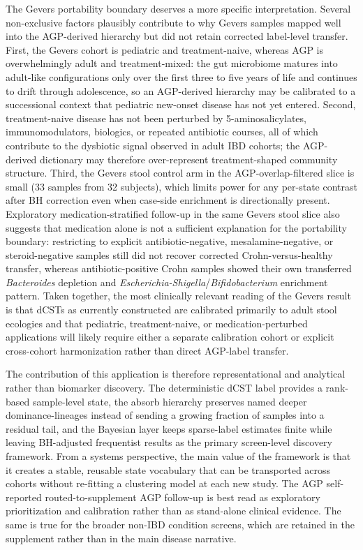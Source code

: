 \documentclass[
  11pt,
]{article}
\newcommand{\taxon}[1]{\emph{#1}}
\newcommand{\dcstsep}{/\allowbreak}
\begin{document}
The Gevers portability boundary deserves a more specific
interpretation. Several non-exclusive factors plausibly contribute to
why Gevers samples mapped well into the AGP-derived hierarchy but did
not retain corrected label-level transfer. First, the Gevers cohort is
pediatric and treatment-naive, whereas AGP is overwhelmingly adult and
treatment-mixed: the gut microbiome matures into adult-like
configurations only over the first three to five years of life and
continues to drift through adolescence, so an AGP-derived hierarchy may
be calibrated to a successional context that pediatric new-onset
disease has not yet entered. Second, treatment-naive disease has not
been perturbed by 5-aminosalicylates, immunomodulators, biologics, or
repeated antibiotic courses, all of which contribute to the dysbiotic
signal observed in adult IBD cohorts; the AGP-derived dictionary may
therefore over-represent treatment-shaped community structure. Third,
the Gevers stool control arm in the AGP-overlap-filtered slice is small
(33 samples from 32 subjects), which limits power for any per-state
contrast after BH correction even when case-side enrichment is
directionally present. Exploratory medication-stratified follow-up in
the same Gevers stool slice also suggests that medication alone is not a
sufficient explanation for the portability boundary: restricting to
explicit antibiotic-negative, mesalamine-negative, or steroid-negative
samples still did not recover corrected Crohn-versus-healthy transfer,
whereas antibiotic-positive Crohn samples showed their own transferred
\taxon{Bacteroides} depletion and
\taxon{Escherichia-Shigella}\dcstsep\taxon{Bifidobacterium}
enrichment pattern. Taken together, the most clinically relevant
reading of the Gevers result is that dCSTs as currently constructed are
calibrated primarily to adult stool ecologies and that pediatric,
treatment-naive, or medication-perturbed applications will likely
require either a separate calibration cohort or explicit cross-cohort
harmonization rather than direct AGP-label transfer.

The contribution of this application is therefore representational and
analytical rather than biomarker discovery. The deterministic dCST label
provides a rank-based sample-level state, the absorb hierarchy preserves
named deeper dominance-lineages instead of sending a growing fraction of
samples into a residual tail, and the Bayesian layer keeps sparse-label
estimates finite while leaving BH-adjusted frequentist results as the
primary screen-level discovery framework. From a systems perspective,
the main value of the framework is that it creates a stable, reusable
state vocabulary that can be transported across cohorts without
re-fitting a clustering model at each new study. The AGP self-reported
routed-to-supplement AGP follow-up is best read as exploratory
prioritization and calibration
rather than as stand-alone clinical evidence. The same is true for the
broader non-IBD condition screens, which are retained in the supplement
rather than in the main disease narrative.
\end{document}
